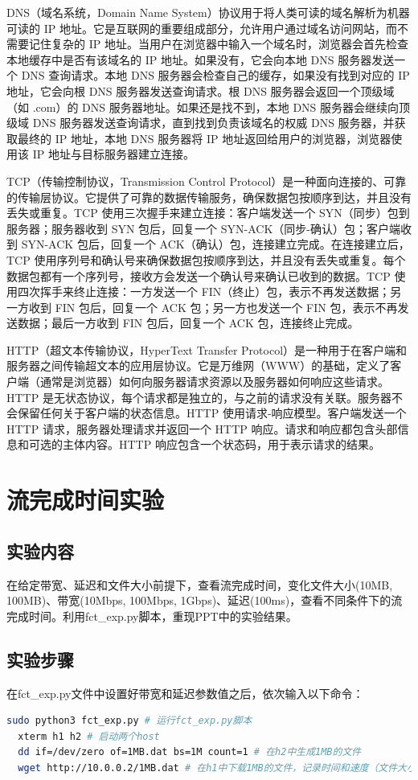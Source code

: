 \documentclass[UTF8]{article}
\begin{document}
DNS（域名系统，Domain Name System）协议用于将人类可读的域名解析为机器可读的 IP 地址。它是互联网的重要组成部分，允许用户通过域名访问网站，而不需要记住复杂的 IP 地址。当用户在浏览器中输入一个域名时，浏览器会首先检查本地缓存中是否有该域名的 IP 地址。如果没有，它会向本地 DNS 服务器发送一个 DNS 查询请求。本地 DNS 服务器会检查自己的缓存，如果没有找到对应的 IP 地址，它会向根 DNS 服务器发送查询请求。根 DNS 服务器会返回一个顶级域（如 .com）的 DNS 服务器地址。如果还是找不到，本地 DNS 服务器会继续向顶级域 DNS 服务器发送查询请求，直到找到负责该域名的权威 DNS 服务器，并获取最终的 IP 地址，本地 DNS 服务器将 IP 地址返回给用户的浏览器，浏览器使用该 IP 地址与目标服务器建立连接。

TCP（传输控制协议，Transmission Control Protocol）是一种面向连接的、可靠的传输层协议。它提供了可靠的数据传输服务，确保数据包按顺序到达，并且没有丢失或重复。TCP 使用三次握手来建立连接：客户端发送一个 SYN（同步）包到服务器；服务器收到 SYN 包后，回复一个 SYN-ACK（同步-确认）包；客户端收到 SYN-ACK 包后，回复一个 ACK（确认）包，连接建立完成。在连接建立后，TCP 使用序列号和确认号来确保数据包按顺序到达，并且没有丢失或重复。每个数据包都有一个序列号，接收方会发送一个确认号来确认已收到的数据。TCP 使用四次挥手来终止连接：一方发送一个 FIN（终止）包，表示不再发送数据；另一方收到 FIN 包后，回复一个 ACK 包；另一方也发送一个 FIN 包，表示不再发送数据；最后一方收到 FIN 包后，回复一个 ACK 包，连接终止完成。


HTTP（超文本传输协议，HyperText Transfer Protocol）是一种用于在客户端和服务器之间传输超文本的应用层协议。它是万维网（WWW）的基础，定义了客户端（通常是浏览器）如何向服务器请求资源以及服务器如何响应这些请求。HTTP 是无状态协议，每个请求都是独立的，与之前的请求没有关联。服务器不会保留任何关于客户端的状态信息。HTTP 使用请求-响应模型。客户端发送一个 HTTP 请求，服务器处理请求并返回一个 HTTP 响应。请求和响应都包含头部信息和可选的主体内容。HTTP 响应包含一个状态码，用于表示请求的结果。

\section{流完成时间实验}

\subsection{实验内容}

在给定带宽、延迟和文件大小前提下，查看流完成时间，变化文件大小(10MB, 100MB)、带宽(10Mbps, 100Mbps, 1Gbps)、延迟(100ms)，查看不同条件下的流完成时间。利用fct_exp.py脚本，重现PPT中的实验结果。

\subsection{实验步骤}

在fct_exp.py文件中设置好带宽和延迟参数值之后，依次输入以下命令：

\begin{lstlisting}[language=bash]
  sudo python3 fct_exp.py # 运行fct_exp.py脚本
  xterm h1 h2 # 启动两个host
  dd if=/dev/zero of=1MB.dat bs=1M count=1 # 在h2中生成1MB的文件
  wget http://10.0.0.2/1MB.dat # 在h1中下载1MB的文件，记录时间和速度（文件大小更换为10MB和100MB）
\end{lstlisting}
\end{document}
